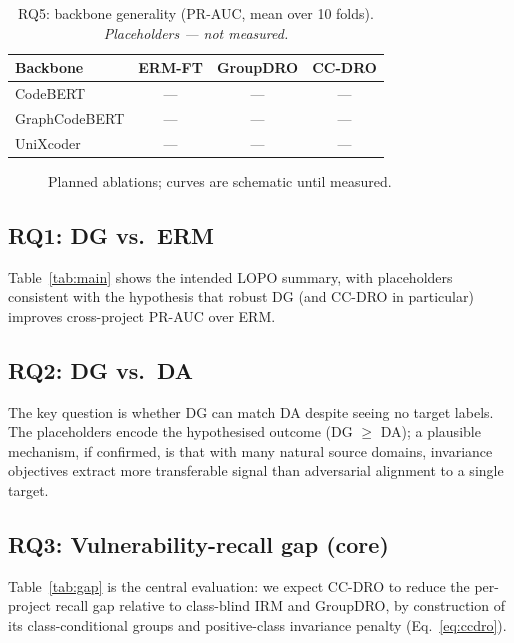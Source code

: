 \documentclass[conference]{IEEEtran}
\begin{document}
\begin{table}[t]
\centering
\caption{RQ5: backbone generality (PR-AUC, mean over 10 folds).
\emph{Placeholders --- not measured.}}
\label{tab:backbone}
\begin{tabular}{lccc}
\toprule
Backbone & ERM-FT & GroupDRO & \textbf{CC-DRO} \\
\midrule
CodeBERT      & --- & --- & --- \\
GraphCodeBERT & --- & --- & --- \\
UniXcoder     & --- & --- & --- \\
\bottomrule
\end{tabular}
\end{table}

\begin{figure}[t]
\centering
{}
\caption{Planned ablations; curves are schematic until measured.}
\label{fig:abl}
\end{figure}

\subsection{RQ1: DG vs.\ ERM}
Table~\ref{tab:main} shows the intended LOPO summary, with
placeholders consistent with the hypothesis that robust DG (and
CC-DRO in particular) improves cross-project PR-AUC over ERM.

\subsection{RQ2: DG vs.\ DA}
The key question is whether DG can match DA despite seeing no
target labels. The placeholders encode the hypothesised outcome
(DG $\ge$ DA); a plausible mechanism, if confirmed, is that with
many natural source domains, invariance objectives extract more
transferable signal than adversarial alignment to a single target.

\subsection{RQ3: Vulnerability-recall gap (core)}
Table~\ref{tab:gap} is the central evaluation: we expect CC-DRO to
reduce the per-project recall gap relative to class-blind IRM and
GroupDRO, by construction of its class-conditional groups and
positive-class invariance penalty (Eq.~\ref{eq:ccdro}).
\end{document}
